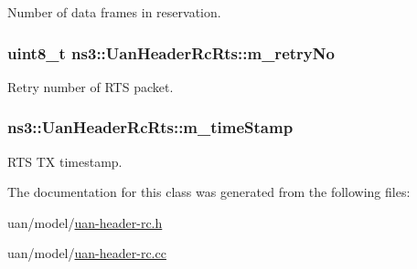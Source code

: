 Number of data frames in reservation. 

\subsubsection[{\texorpdfstring{m\+\_\+retry\+No}{m_retryNo}}]{\setlength{\rightskip}{0pt plus 5cm}uint8\+\_\+t ns3\+::\+Uan\+Header\+Rc\+Rts\+::m\+\_\+retry\+No\hspace{0.3cm}{\ttfamily [private]}}\hypertarget{classns3_1_1UanHeaderRcRts_a354a45a3ba84f035501821520a844e58}{}\label{classns3_1_1UanHeaderRcRts_a354a45a3ba84f035501821520a844e58}


Retry number of R\+TS packet. 

\subsubsection[{\texorpdfstring{m\+\_\+time\+Stamp}{m_timeStamp}}]{ ns3\+::\+Uan\+Header\+Rc\+Rts\+::m\+\_\+time\+Stamp\hspace{0.3cm}{\ttfamily [private]}}\hypertarget{classns3_1_1UanHeaderRcRts_af7cb4639a453a02f98bf46239ae8de6a}{}\label{classns3_1_1UanHeaderRcRts_af7cb4639a453a02f98bf46239ae8de6a}


R\+TS TX timestamp. 



The documentation for this class was generated from the following files\+:\begin{DoxyCompactItemize}
\item 
uan/model/\hyperlink{uan-header-rc_8h}{uan-\/header-\/rc.\+h}\item 
uan/model/\hyperlink{uan-header-rc_8cc}{uan-\/header-\/rc.\+cc}\end{DoxyCompactItemize}
